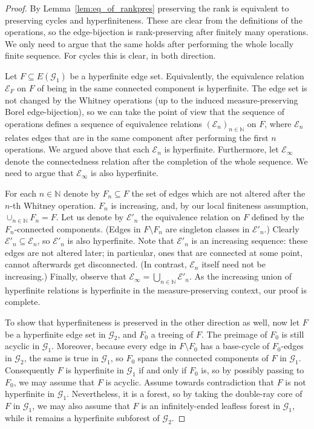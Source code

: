 \documentclass{article}
\theoremstyle{plain}
\theoremstyle{definition}
\newcommand{\N}{\mathbb{N}}
\newcommand{\cG}{\mathcal{G}}
\newcommand{\cE}{\mathcal{E}}
\begin{document}
\begin{proof}
    By Lemma~\ref{lem:eq_of_rankpres} preserving the rank is equivalent to preserving cycles and hyperfiniteness. These are clear from the definitions of the operations, so the edge-bijection is rank-preserving after finitely many operations. We only need to argue that the same holds after performing the whole locally finite sequence. For cycles this is clear, in both direction.
    
    Let $F \subseteq E(\cG_1)$ be a hyperfinite edge set. Equivalently, the equivalence relation $\mathcal{E}_F$ on $F$ of being in the same connected component is hyperfinite. The edge set is not changed by the Whitney operations (up to the induced measure-preserving Borel edge-bijection), so we can take the point of view that the sequence of operations defines a sequence of equivalence relations $(\cE_n)_{n\in \N}$ on $F$, where $\cE_n$ relates edges that are in the same component after performing the first $n$ operations. We argued above that each $\cE_n$ is hyperfinite. Furthermore, let $\cE_{\infty}$ denote the connectedness relation after the completion of the whole sequence. We need to argue that $\cE_{\infty}$ is also hyperfinite. 

    For each $n \in \N$ denote by $F_n \subseteq F$ the set of edges which are not altered after the $n$-th Whitney operation. $F_n $ is increasing, and, by our local finiteness assumption, $\cup_{n \in \N} F_n = F$. Let us denote by $\cE'_n$ the equivalence relation on $F$ defined by the $F_n$-connected components. (Edges in $F \setminus F_n$ are singleton classes in $\cE'_n$.) Clearly $\cE'_n \subseteq \cE_n$, so  $\cE'_n$ is also hyperfinite. Note that $\cE'_n$ is an increasing sequence: these edges are not altered later; in particular, ones that are connected at some point, cannot afterwards get disconnected. (In contrast, $\cE_n$ itself need not be increasing.) Finally, observe that $\cE_\infty = \bigcup_{n \in \N} \cE'_n$. As the increasing union of hyperfinite relations is hyperfinite in the measure-preserving context, our proof is complete.

    To show that hyperfiniteness is preserved in the other direction as well, now let $F$ be a hyperfinite edge set in $\cG_2$, and $F_0$ a treeing of $F$. The preimage of $F_0$ is still acyclic in $\cG_1$. Moreover, because every edge in $F\setminus F_0$ has a base-cycle of $F_0$-edges in $\cG_2$, the same is true in $\cG_1$, so $F_0$ spans the connected components of $F$ in $\cG_1$. Consequently $F$ is hyperfinite in $\cG_1$ if and only if $F_0$ is, so by possibly passing to $F_0$, we may assume that $F$ is acyclic. Assume towards contradiction that $F$ is not hyperfinite in $\cG_1$. Nevertheless, it is a forest, so by taking the double-ray core of $F$ in $\cG_1$, we may also assume that $F$ is an infinitely-ended leafless forest in $\cG_1$, while it remains a hyperfinite subforest of $\cG_2$. 


\end{proof}
\end{document}
